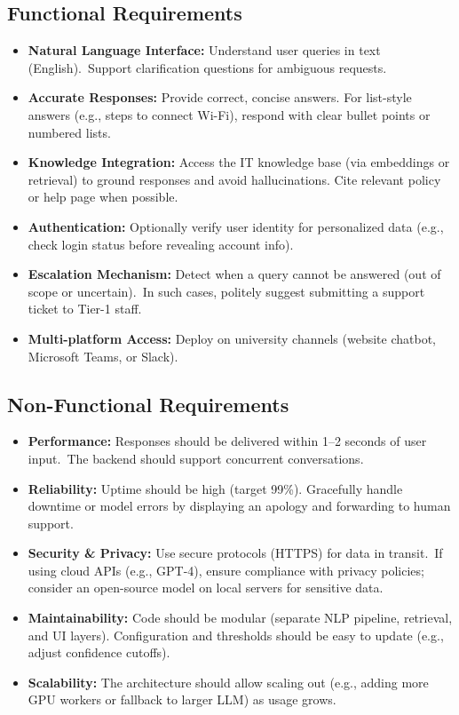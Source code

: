 \documentclass{article.cls}
\begin{document}
    \subsection{Functional Requirements}
    \begin{itemize}
        \item \textbf{Natural Language Interface:} Understand user queries in text (English).\ Support clarification questions for ambiguous requests.
        \item \textbf{Accurate Responses:} Provide correct, concise answers.
        For list-style answers (e.g., steps to connect Wi-Fi), respond with clear bullet points or numbered lists.
        \item \textbf{Knowledge Integration:} Access the IT knowledge base (via embeddings or retrieval) to ground responses and avoid hallucinations. Cite relevant policy or help page when possible.
        \item \textbf{Authentication:} Optionally verify user identity for personalized data (e.g., check login status before revealing account info).
        \item \textbf{Escalation Mechanism:} Detect when a query cannot be answered (out of scope or uncertain).\ In such cases, politely suggest submitting a support ticket to Tier-1 staff.
        \item \textbf{Multi-platform Access:} Deploy on university channels (website chatbot, Microsoft Teams, or Slack).
    \end{itemize}

    \subsection{Non-Functional Requirements}
    \begin{itemize}
        \item \textbf{Performance:} Responses should be delivered within 1--2 seconds of user input.\ The backend should support concurrent conversations.
        \item \textbf{Reliability:} Uptime should be high (target 99\%). Gracefully handle downtime or model errors by displaying an apology and forwarding to human support.
        \item \textbf{Security \& Privacy:} Use secure protocols (HTTPS) for data in transit.\ If using cloud APIs (e.g., GPT-4), ensure compliance with privacy policies; consider an open-source model on local servers for sensitive data.
        \item \textbf{Maintainability:} Code should be modular (separate NLP pipeline, retrieval, and UI layers).
        Configuration and thresholds should be easy to update (e.g., adjust confidence cutoffs).
        \item \textbf{Scalability:} The architecture should allow scaling out (e.g., adding more GPU workers or fallback to larger LLM) as usage grows.
    \end{itemize}
\end{document}
